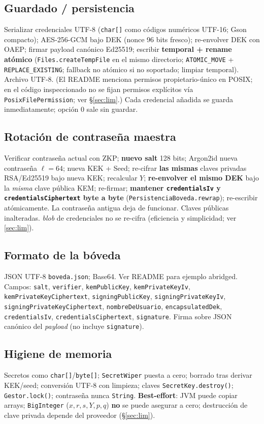 \documentclass[11pt,a4paper]{article}
\begin{document}
\subsection{Guardado / persistencia}
Serializar credenciales UTF-8 (\texttt{char[]} como códigos numéricos UTF-16;
Gson compacto); AES-256-GCM bajo DEK (nonce 96 bits fresco); re-envolver DEK con
OAEP; firmar payload canónico Ed25519; escribir \textbf{temporal + rename atómico}
(\texttt{Files.createTempFile} en el mismo directorio; \texttt{ATOMIC\_MOVE} +
\texttt{REPLACE\_EXISTING}; fallback no atómico si no soportado; limpiar temporal).
Archivo UTF-8. (El README menciona permisos propietario-único en POSIX; en el
código inspeccionado no se fijan permisos explícitos vía
\texttt{PosixFilePermission}; ver §\ref{sec:lim}.)
Cada credencial añadida se guarda inmediatamente; opción 0 sale sin guardar.

\subsection{Rotación de contraseña maestra}\label{sec:rot}
Verificar contraseña actual con ZKP; \textbf{nuevo salt} 128 bits; Argon2id
nueva contraseña $\ell=64$; nueva KEK + Seed; re-cifrar \textbf{las mismas} claves
privadas RSA/Ed25519 bajo nueva KEK; recalcular $Y$; \textbf{re-envolver el mismo
DEK} bajo la \emph{misma} clave pública KEM; re-firmar; \textbf{mantener
\texttt{credentialsIv} y \texttt{credentialsCiphertext} byte a byte}
(\texttt{PersistenciaBoveda.rewrap}); re-escribir atómicamente. La contraseña
antigua deja de funcionar. Claves públicas inalteradas. \emph{blob} de credenciales
no se re-cifra (eficiencia y simplicidad; ver \ref{sec:lim}).

\subsection{Formato de la bóveda}
JSON UTF-8 \texttt{boveda.json}; Base64. Ver README para ejemplo abridged. Campos:
\texttt{salt}, \texttt{verifier}, \texttt{kemPublicKey}, \texttt{kemPrivateKeyIv},
\texttt{kemPrivateKeyCiphertext}, \texttt{signingPublicKey},
\texttt{signingPrivateKeyIv}, \texttt{signingPrivateKeyCiphertext},
\texttt{nombreDeUsuario}, \texttt{encapsulatedDek}, \texttt{credentialsIv},
\texttt{credentialsCiphertext}, \texttt{signature}. Firma sobre JSON canónico del
\emph{payload} (no incluye \texttt{signature}).

\subsection{Higiene de memoria}
Secretos como \texttt{char[]}/\texttt{byte[]}; \texttt{SecretWiper} puesta a cero;
borrado tras derivar KEK/seed; conversión UTF-8 con limpieza; claves
\texttt{SecretKey.destroy()}; \texttt{Gestor.lock()}; contraseña nunca \texttt{String}.
\textbf{Best-effort}: JVM puede copiar arrays; \texttt{BigInteger} ($x, r, s, Y, p, q$)
\textbf{no} se puede asegurar a cero; destrucción de clave privada depende del
proveedor (§\ref{sec:lim}).
\end{document}
